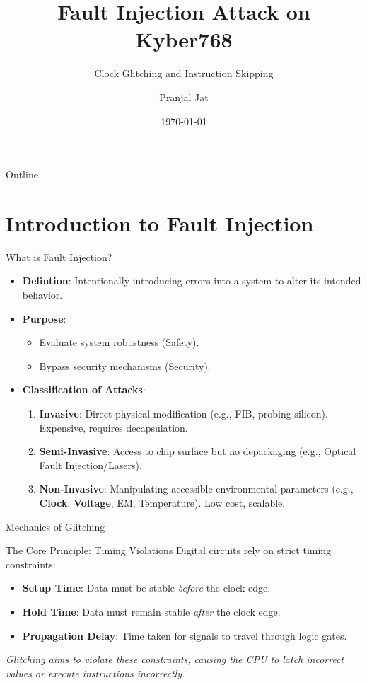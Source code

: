 \documentclass[aspectratio=169]{beamer}
\title{Fault Injection Attack on Kyber768}
\subtitle{Clock Glitching and Instruction Skipping}
\author{Pranjal Jat}
\date{\today}
\begin{document}
\begin{frame}
    \titlepage
\end{frame}

\begin{frame}{Outline}
    \tableofcontents
\end{frame}

\section{Introduction to Fault Injection}
\begin{frame}{What is Fault Injection?}
    \begin{itemize}
        \item \textbf{Defintion}: Intentionally introducing errors into a system to alter its intended behavior.
        \item \textbf{Purpose}: 
            \begin{itemize}
                \item Evaluate system robustness (Safety).
                \item Bypass security mechanisms (Security).
            \end{itemize}
        \item \textbf{Classification of Attacks}:
            \begin{enumerate}
                \item \textbf{Invasive}: Direct physical modification (e.g., FIB, probing silicon). Expensive, requires decapsulation.
                \item \textbf{Semi-Invasive}: Access to chip surface but no depackaging (e.g., Optical Fault Injection/Lasers).
                \item \textbf{Non-Invasive}: Manipulating accessible environmental parameters (e.g., \textbf{Clock}, \textbf{Voltage}, EM, Temperature). Low cost, scalable.
            \end{enumerate}
    \end{itemize}
\end{frame}

\begin{frame}{Mechanics of Glitching}
    \begin{block}{The Core Principle: Timing Violations}
    Digital circuits rely on strict timing constraints:
    \begin{itemize}
        \item \textbf{Setup Time}: Data must be stable \textit{before} the clock edge.
        \item \textbf{Hold Time}: Data must remain stable \textit{after} the clock edge.
        \item \textbf{Propagation Delay}: Time taken for signals to travel through logic gates.
    \end{itemize}
    \textit{Glitching aims to violate these constraints, causing the CPU to latch incorrect values or execute instructions incorrectly.}
    \end{block}
\end{frame}
\end{document}
